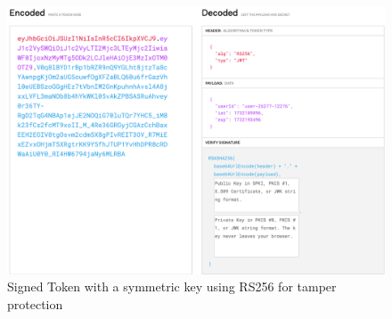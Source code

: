 \begin{figure}[!htbp]
    \includegraphics[width=\textwidth]{pics/token_signed.png}
    \caption{Signed Token with a symmetric key using RS256 for tamper protection}
    \label{fig:token_tenant_1_token_signed}
\end{figure}